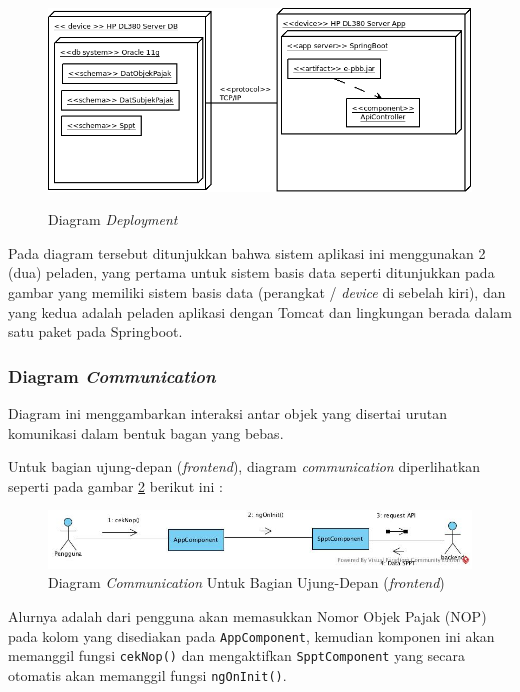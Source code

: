 \documentclass[pdftex,12pt, oneside]{article}
\begin{document}
\begin{figure}[H]
	\centering
	\includegraphics[width=1\textwidth]{./resources/deploy-diagram}
	\label{fig:deploy-dia}
	\caption{Diagram \textit{Deployment}}
\end{figure}

Pada diagram tersebut ditunjukkan bahwa sistem aplikasi ini menggunakan 2 (dua) peladen, yang pertama untuk sistem basis data seperti ditunjukkan pada gambar yang memiliki sistem basis data (perangkat / \textit{device} di sebelah kiri), dan yang kedua adalah peladen aplikasi dengan Tomcat dan lingkungan berada dalam satu paket pada Springboot.

\subsubsection{Diagram \textit{Communication}}

Diagram ini menggambarkan interaksi antar objek yang disertai urutan komunikasi dalam bentuk bagan yang bebas. 

Untuk bagian ujung-depan (\textit{frontend}), diagram \textit{communication} diperlihatkan seperti pada gambar \ref{fig:comm-dia-fe} berikut ini :

\begin{figure}[H]
	\centering
	\includegraphics[width=1\textwidth]{./resources/comm-dia-fe}
	\caption{Diagram \textit{Communication} Untuk Bagian Ujung-Depan (\textit{frontend})}
	\label{fig:comm-dia-fe}
\end{figure}

Alurnya adalah dari pengguna akan memasukkan Nomor Objek Pajak (NOP) pada kolom yang disediakan pada \texttt{AppComponent}, kemudian komponen ini akan memanggil fungsi \texttt{cekNop()} dan mengaktifkan \texttt{SpptComponent} yang secara otomatis akan memanggil fungsi \texttt{ngOnInit()}.
\end{document}
